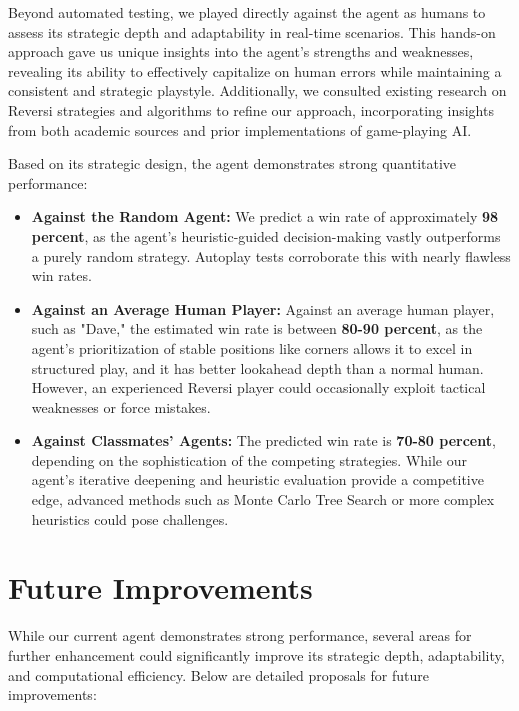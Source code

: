 \documentclass[11pt]{article}
\begin{document}
\noindent Beyond automated testing, we played directly against the agent as humans to assess its strategic depth and adaptability in real-time scenarios. This hands-on approach gave us unique insights into the agent’s strengths and weaknesses, revealing its ability to effectively capitalize on human errors while maintaining a consistent and strategic playstyle. Additionally, we consulted existing research on Reversi strategies and algorithms to refine our approach, incorporating insights from both academic sources and prior implementations of game-playing AI.

\noindent Based on its strategic design, the agent demonstrates strong quantitative performance:
\begin{itemize}
    \item \textbf{Against the Random Agent:} We predict a win rate of approximately \textbf{98 percent}, as the agent’s heuristic-guided decision-making vastly outperforms a purely random strategy. Autoplay tests corroborate this with nearly flawless win rates.
    \item \textbf{Against an Average Human Player:} Against an average human player, such as "Dave," the estimated win rate is between \textbf{80-90 percent}, as the agent’s prioritization of stable positions like corners allows it to excel in structured play, and it has better lookahead depth than a normal human. However, an experienced Reversi player could occasionally exploit tactical weaknesses or force mistakes.
    \item \textbf{Against Classmates’ Agents:} The predicted win rate is \textbf{70-80 percent}, depending on the sophistication of the competing strategies. While our agent's iterative deepening and heuristic evaluation provide a competitive edge, advanced methods such as Monte Carlo Tree Search or more complex heuristics could pose challenges.
\end{itemize}


\section*{Future Improvements}
While our current agent demonstrates strong performance, several areas for further enhancement could significantly improve its strategic depth, adaptability, and computational efficiency. Below are detailed proposals for future improvements:
\end{document}
